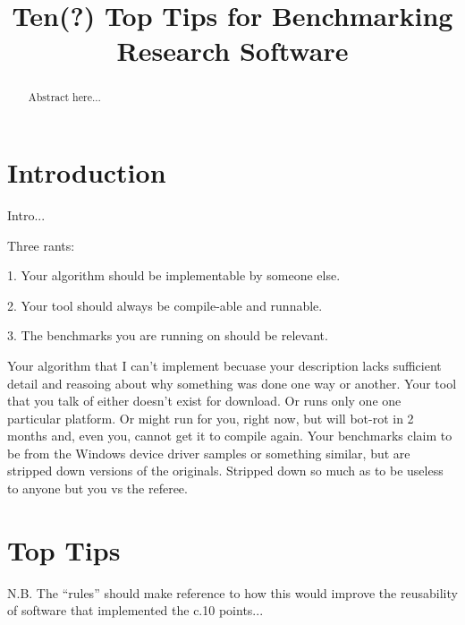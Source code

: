 \documentclass[conference]{IEEEtran}
\begin{document}
%
\title{Ten(?) Top Tips for Benchmarking Research Software}

\author{
\and
{}
}

\maketitle

\begin{abstract}
Abstract here...
\end{abstract}

\IEEEpeerreviewmaketitle

\section{Introduction}
Intro...

Three rants:

1. Your algorithm should be implementable by someone else.

2. Your tool should always be compile-able and runnable. 

3. The benchmarks you are running on should be relevant. 


Your algorithm that I can't implement becuase your description lacks sufficient detail and reasoing about why something was done one way or another. 
Your tool that you talk of either doesn't exist for download. Or runs only one one particular platform. Or might run for you, right now, but will bot-rot in 2 months and, even you, cannot get it to compile again. 
Your benchmarks claim to be from the Windows device driver samples or something similar, but are stripped down versions of the originals. Stripped down so much as to be useless to anyone but you vs the referee. 

\section{Top Tips}
N.B. The ``rules'' should make reference to how this would improve the reusability of software that implemented the c.10 points...
\end{document}
